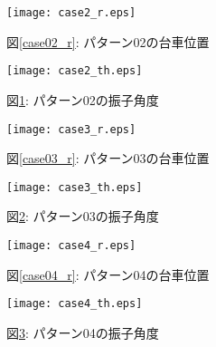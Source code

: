 \begin{figure}[htbp]
    \begin{minipage}{0.5\hsize}
        \begin{center}
            \texttt{[image: case2\_r.eps]}
            \caption{図\ref{case02_r}: パターン02の台車位置}
            \label{case02_r}
        \end{center}
    \end{minipage}
    \begin{minipage}{0.5\hsize}
        \begin{center}
            \texttt{[image: case2\_th.eps]}
            \caption{図\ref{case02_th}: パターン02の振子角度}
            \label{case02_th}
        \end{center}
    \end{minipage}
\end{figure}

\begin{figure}[htbp]
    \begin{minipage}{0.5\hsize}
        \begin{center}
            \texttt{[image: case3\_r.eps]}
            \caption{図\ref{case03_r}: パターン03の台車位置}
            \label{case03_r}
        \end{center}
    \end{minipage}
    \begin{minipage}{0.5\hsize}
        \begin{center}
            \texttt{[image: case3\_th.eps]}
            \caption{図\ref{case03_th}: パターン03の振子角度}
            \label{case03_th}
        \end{center}
    \end{minipage}
\end{figure}

\begin{figure}[htbp]
    \begin{minipage}{0.5\hsize}
        \begin{center}
            \texttt{[image: case4\_r.eps]}
            \caption{図\ref{case04_r}: パターン04の台車位置}
            \label{case04_r}
        \end{center}
    \end{minipage}
    \begin{minipage}{0.5\hsize}
        \begin{center}
            \texttt{[image: case4\_th.eps]}
            \caption{図\ref{case04_th}: パターン04の振子角度}
            \label{case04_th}
        \end{center}
    \end{minipage}
\end{figure}

